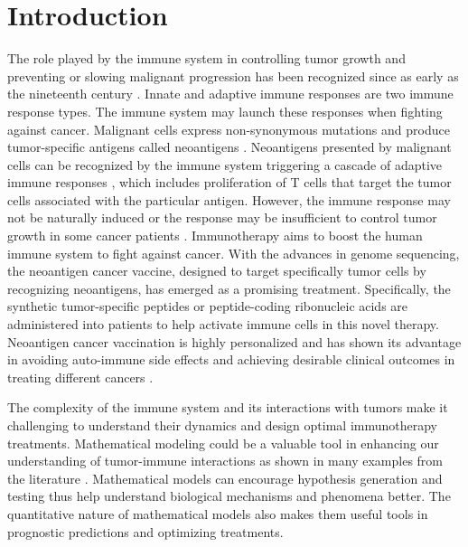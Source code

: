 \documentclass[review,authoryear]{elsarticle}
\begin{document}
\linenumbers

\section{Introduction}

The role played by the immune system in controlling tumor growth
and preventing or slowing malignant progression has been recognized since as early as the nineteenth century \citep[see a historical review by][]{oiseth2017cancer}. Innate and adaptive
immune responses are two immune response types. The immune system may launch these responses when fighting against cancer. Malignant cells express non-synonymous mutations
and produce tumor-specific antigens called neoantigens \citep{Peng2019}.
Neoantigens presented by malignant cells can be recognized by the immune system triggering a cascade of adaptive
immune responses \citep{Zhang2021}, which includes proliferation of T cells
that target the tumor cells associated with the particular antigen.
However, the immune response may not be naturally induced or the response may be insufficient to control tumor growth in some cancer patients \citep{Ward2016}. Immunotherapy aims to boost the human immune system to fight
against cancer. With the advances in genome sequencing, the neoantigen
cancer vaccine, designed to target specifically tumor cells
by recognizing neoantigens, has emerged as a promising treatment. Specifically, the synthetic tumor-specific
peptides or peptide-coding ribonucleic acids are administered into patients to help activate immune cells in this novel therapy. Neoantigen cancer vaccination is highly personalized and has shown its advantage in avoiding auto-immune
side effects \citep{Nelde2021} and achieving desirable clinical outcomes in
treating different cancers
\citep[e.g.][]{Ott2017,Pan2018,Peng2019}. 

The complexity of the immune system and its interactions with tumors
make it challenging to understand their dynamics and design optimal
immunotherapy treatments. Mathematical modeling could be a valuable tool in enhancing our understanding of tumor-immune interactions as shown in many examples from the literature \citep[e.g., see reviews by][and references therein]{Eftimie2016,Mahlbacher2019,Nukala2021}. Mathematical models can encourage hypothesis generation and testing thus help understand biological mechanisms and phenomena better. The
quantitative nature of mathematical models also makes them useful tools in prognostic predictions and optimizing treatments. 
\end{document}
